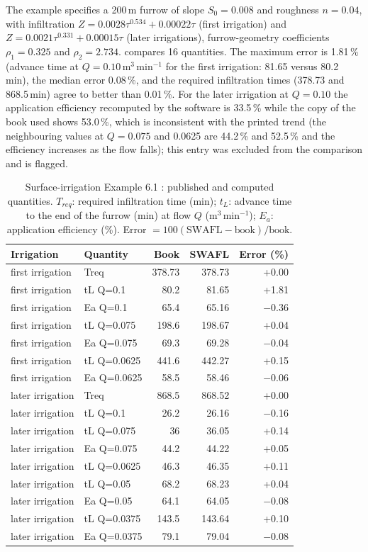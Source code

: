 The example specifies a 200\,m furrow of slope $S_0=0.008$ and roughness $n=0.04$, with infiltration $Z=0.0028\tau^{0.534}+0.00022\tau$ (first irrigation) and $Z=0.0021\tau^{0.331}+0.00015\tau$ (later irrigations), furrow-geometry coefficients $\rho_1=0.325$ and $\rho_2=2.734$.  compares 16 quantities. The maximum error is 1.81\,\% (advance time at $Q=0.10$\,m$^3$\,min$^{-1}$ for the first irrigation: 81.65 versus 80.2\,min), the median error 0.08\,\%, and the required infiltration times (378.73 and 868.5\,min) agree to better than 0.01\,\%. For the later irrigation at $Q=0.10$ the application efficiency recomputed by the software is 33.5\,\% while the copy of the book used shows 53.0\,\%, which is inconsistent with the printed trend (the neighbouring values at $Q=0.075$ and 0.0625 are 44.2\,\% and 52.5\,\% and the efficiency increases as the flow falls); this entry was excluded from the comparison and is flagged.

\begin{table}[H]\centering\small
\caption{Surface-irrigation Example 6.1 \citep{Walker1987}: published and computed quantities. $T_{req}$: required infiltration time (min); $t_L$: advance time to the end of the furrow (min) at flow $Q$ (m$^3$\,min$^{-1}$); $E_a$: application efficiency (\%). Error $=100(\text{SWAFL}-\text{book})/\text{book}$.}
\label{tab:ws}
\begin{tabular}{llrrr}
\toprule
Irrigation & Quantity & Book & SWAFL & Error (\%)\\\midrule
first irrigation & Treq & 378.73 & 378.73 & +0.00\\
first irrigation & tL Q=0.1 & 80.2 & 81.65 & +1.81\\
first irrigation & Ea Q=0.1 & 65.4 & 65.16 & $-$0.36\\
first irrigation & tL Q=0.075 & 198.6 & 198.67 & +0.04\\
first irrigation & Ea Q=0.075 & 69.3 & 69.28 & $-$0.04\\
first irrigation & tL Q=0.0625 & 441.6 & 442.27 & +0.15\\
first irrigation & Ea Q=0.0625 & 58.5 & 58.46 & $-$0.06\\
later irrigation & Treq & 868.5 & 868.52 & +0.00\\
later irrigation & tL Q=0.1 & 26.2 & 26.16 & $-$0.16\\
later irrigation & tL Q=0.075 & 36 & 36.05 & +0.14\\
later irrigation & Ea Q=0.075 & 44.2 & 44.22 & +0.05\\
later irrigation & tL Q=0.0625 & 46.3 & 46.35 & +0.11\\
later irrigation & tL Q=0.05 & 68.2 & 68.23 & +0.04\\
later irrigation & Ea Q=0.05 & 64.1 & 64.05 & $-$0.08\\
later irrigation & tL Q=0.0375 & 143.5 & 143.64 & +0.10\\
later irrigation & Ea Q=0.0375 & 79.1 & 79.04 & $-$0.08\\
\bottomrule
\end{tabular}
\end{table}

